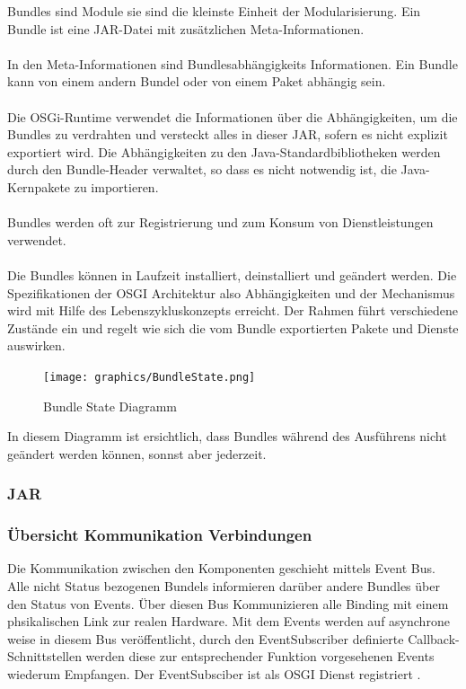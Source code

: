 Bundles sind Module sie sind die kleinste Einheit der Modularisierung. Ein Bundle ist eine JAR-Datei mit zusätzlichen Meta-Informationen.\\
\\
In den Meta-Informationen sind Bundlesabhängigkeits Informationen. Ein Bundle kann von einem andern Bundel oder von einem Paket abhängig sein.\\
\\
Die OSGi-Runtime verwendet die Informationen über die Abhängigkeiten, um die Bundles zu verdrahten und versteckt alles in dieser JAR, sofern es nicht explizit exportiert wird. Die Abhängigkeiten zu den Java-Standardbibliotheken werden durch den Bundle-Header verwaltet, so dass es nicht notwendig ist, die Java-Kernpakete zu importieren.\\
\\
Bundles werden oft zur Registrierung und zum Konsum von Dienstleistungen verwendet.\\
\\
Die Bundles können in Laufzeit installiert, deinstalliert und geändert werden. Die Spezifikationen der OSGI Architektur also Abhängigkeiten und der Mechanismus wird mit Hilfe des Lebenszykluskonzepts erreicht. Der Rahmen führt verschiedene Zustände ein und regelt wie sich die vom Bundle exportierten Pakete und Dienste auswirken. 

 \begin{figure}[H]
	\centering
	\texttt{[image: graphics/BundleState.png]}
	\caption{Bundle State Diagramm \cite{noauthor_osgi_nodate}} 	
	\label{pic: BundleState}
\end{figure} 

In diesem Diagramm ist ersichtlich, dass Bundles während des Ausführens nicht geändert werden können, sonnst aber jederzeit.

\subsubsection{JAR}
\subsubsection{Übersicht Kommunikation Verbindungen}
Die Kommunikation zwischen den Komponenten geschieht mittels Event Bus. Alle nicht Status bezogenen Bundels informieren darüber andere Bundles über den Status von Events. Über diesen Bus Kommunizieren alle Binding mit einem phsikalischen Link zur realen Hardware. Mit dem Events werden auf asynchrone weise in diesem Bus veröffentlicht, durch den EventSubscriber definierte Callback-Schnittstellen werden diese zur entsprechender Funktion vorgesehenen Events wiederum Empfangen. Der EventSubsciber ist als OSGI Dienst registriert \cite{noauthor_event_nodate}.

